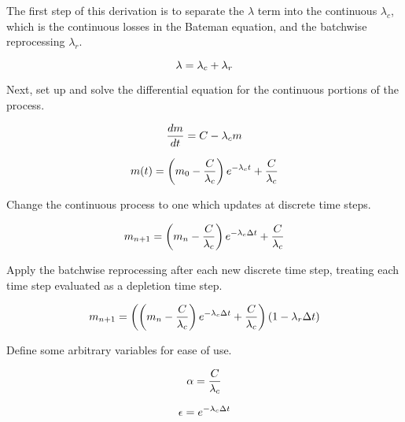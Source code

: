 

The first step of this derivation is to separate the $\lambda$ term into the continuous $\lambda_c$, which is the continuous losses in the Bateman equation, and the batchwise reprocessing $\lambda_r$.

\begin{equation} \hfill
\lambda = \lambda_c + \lambda_r
\hfill \end{equation}

Next, set up and solve the differential equation for the continuous portions of the process.

\begin{equation} \hfill
\frac{dm}{dt} = C - \lambda_c m
\hfill \end{equation}

\begin{equation} \hfill
m(t) = \left(m_0 - \frac{C}{\lambda_c} \right) e^{-\lambda_c t}  + \frac{C}{\lambda_c}
\hfill \end{equation}

Change the continuous process to one which updates at discrete time steps.

\begin{equation} \hfill
m_{n+1} = \left(m_n - \frac{C}{\lambda_c} \right) e^{-\lambda_c \Delta t}  + \frac{C}{\lambda_c}
\hfill \end{equation}

Apply the batchwise reprocessing after each new discrete time step, treating each time step evaluated as a depletion time step.

\begin{equation} \hfill
m_{n+1} = \left(\left(m_n - \frac{C}{\lambda_c} \right) e^{-\lambda_c \Delta t}  + \frac{C}{\lambda_c}\right) \left(1 - {\lambda_r \Delta t} \right)
\hfill \end{equation}

Define some arbitrary variables for ease of use.

\begin{equation} \hfill
\alpha = \frac{C}{\lambda_c}
\hfill \end{equation}

\begin{equation} \hfill
\epsilon = e^{-\lambda_c \Delta t}
\hfill \end{equation}

